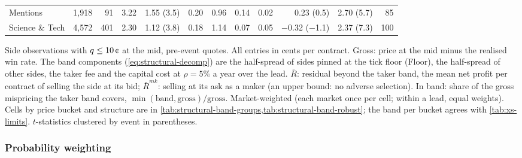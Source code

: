 \begin{table}[!htbp]
\begin{threeparttable}
\begin{tabular}{@{}lrrrrrrrrrrr@{}}
\quad Mentions & 1{,}918 & 91 & 3.22 & 1.55 (3.5) & 0.20 & 0.96 & 0.14 & 0.02 & 0.23 (0.5) & 2.70 (5.7) & 85 \\
\quad Science \& Tech & 4{,}572 & 401 & 2.30 & 1.12 (3.8) & 0.18 & 1.14 & 0.07 & 0.05 & $-$0.32 ($-$1.1) & 2.37 (7.3) & 100 \\
\bottomrule
\end{tabular}
\begin{tablenotes}\footnotesize
\item Side observations with $\q\le10\cents$ at the mid, pre-event quotes. All entries in cents per contract. Gross: price at the mid minus the realised win rate. The band components (\cref{eq:structural-decomp}) are the half-spread of sides pinned at the tick floor (Floor), the half-spread of other sides, the taker fee and the capital cost at $\rho=5\%$ a year over the lead. $\bar R$: residual beyond the taker band, the mean net profit per contract of selling the side at its bid; $\bar R^{mk}$: selling at its ask as a maker (an upper bound: no adverse selection). In band: share of the gross mispricing the taker band covers, $\min(\text{band},\text{gross})/\text{gross}$. Market-weighted (each market once per cell; within a lead, equal weights). Cells by price bucket and structure are in \cref{tab:structural-band-groups,tab:structural-band-robust}; the band per bucket agrees with \cref{tab:xs-limits}. $t$-statistics clustered by event in parentheses.
\end{tablenotes}
\end{threeparttable}
\end{table}

\subsubsection{Probability weighting}\label{sec:res-structural-weighting}

